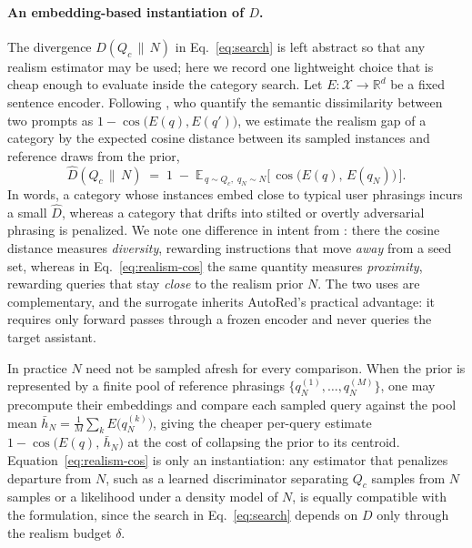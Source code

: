 \documentclass[11pt,a4paper]{article}
\begin{document}
\paragraph{An embedding-based instantiation of $D$.}
The divergence $D\!\left(Q_c \,\|\, N\right)$ in
Eq.~\eqref{eq:search} is left abstract so that any realism estimator may be
used; here we record one lightweight choice that is cheap enough to evaluate
inside the category search. Let $E : \mathcal{X} \rightarrow \mathbb{R}^d$ be a
fixed sentence encoder. Following \citet{diao2025autored}, who quantify the
semantic dissimilarity between two prompts as $1 - \cos\!\big(E(q), E(q')\big)$,
we estimate the realism gap of a category by the expected cosine distance
between its sampled instances and reference draws from the prior,
\begin{equation}
  \widehat{D}\!\left(Q_c \,\|\, N\right)
  \;=\;
  1 \;-\;
  \mathbb{E}_{\,q \sim Q_c,\; q_N \sim N}
  \Big[\, \cos\!\big(E(q),\, E(q_N)\big) \,\Big].
  \label{eq:realism-cos}
\end{equation}
In words, a category whose instances embed close to typical user phrasings
incurs a small $\widehat{D}$, whereas a category that drifts into stilted or
overtly adversarial phrasing is penalized. We note one difference in intent
from \citet{diao2025autored}: there the cosine distance measures
\emph{diversity}, rewarding instructions that move \emph{away} from a seed set,
whereas in Eq.~\eqref{eq:realism-cos} the same quantity measures
\emph{proximity}, rewarding queries that stay \emph{close} to the realism prior
$N$. The two uses are complementary, and the surrogate inherits AutoRed's
practical advantage: it requires only forward passes through a frozen encoder
and never queries the target assistant.

In practice $N$ need not be sampled afresh for every comparison. When the prior
is represented by a finite pool of reference phrasings
$\{q_N^{(1)}, \dots, q_N^{(M)}\}$, one may precompute their embeddings and
compare each sampled query against the pool mean
$\bar{h}_N = \tfrac{1}{M}\sum_{k} E\!\big(q_N^{(k)}\big)$, giving the cheaper
per-query estimate $1 - \cos\!\big(E(q),\, \bar{h}_N\big)$ at the cost of
collapsing the prior to its centroid. Equation~\eqref{eq:realism-cos} is only an
instantiation: any estimator that penalizes departure from $N$, such as a
learned discriminator separating $Q_c$ samples from $N$ samples or a likelihood
under a density model of $N$, is equally compatible with the formulation, since
the search in Eq.~\eqref{eq:search} depends on $D$ only through the realism
budget $\delta$.
\end{document}
